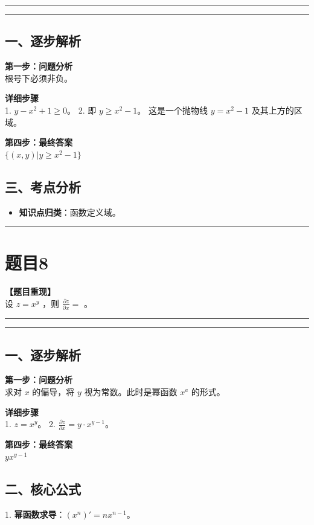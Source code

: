 \documentclass[12pt, a4paper]{ctexart}
\newcommand{\TopSeparator}{
    \par\noindent\rule{\textwidth}{1.5pt}\vspace{0.5em} %
}
\newcommand{\AnalysisSeparator}{
    \par\noindent\rule{\textwidth}{0.5pt}\vspace{0.2em}\hrule\vspace{0.5em} %
}
\newenvironment{RedAnalysis}{
    \par
    \color{red} %
}{
    \par
    \color{black} %
}
\begin{document}
\AnalysisSeparator

\begin{RedAnalysis}

\subsection*{一、逐步解析}

\textbf{第一步：问题分析} \\
根号下必须非负。

\textbf{详细步骤} \\
1. $y - x^2 + 1 \ge 0$。
2. 即 $y \ge x^2 - 1$。
   这是一个抛物线 $y=x^2-1$ 及其上方的区域。

\textbf{第四步：最终答案} \\
$ \{(x,y) | y \ge x^2 - 1\} $

\subsection*{三、考点分析}
\begin{itemize}
    \item \textbf{知识点归类}：函数定义域。
\end{itemize}

\end{RedAnalysis}

\vspace{2em}

\TopSeparator
\section*{题目8}

\textbf{【题目重现】} \\
设 $ z = x^{y} $ ，则 $ \frac{\partial z}{\partial x} = $ \underline{\hspace{2cm}}。

\AnalysisSeparator

\begin{RedAnalysis}

\subsection*{一、逐步解析}

\textbf{第一步：问题分析} \\
求对 $x$ 的偏导，将 $y$ 视为常数。此时是幂函数 $x^a$ 的形式。

\textbf{详细步骤} \\
1. $z = x^y$。
2. $\frac{\partial z}{\partial x} = y \cdot x^{y-1}$。

\textbf{第四步：最终答案} \\
$ yx^{y-1} $

\subsection*{二、核心公式}
1. \textbf{幂函数求导}：$(x^n)' = n x^{n-1}$。

\end{RedAnalysis}
\end{document}
